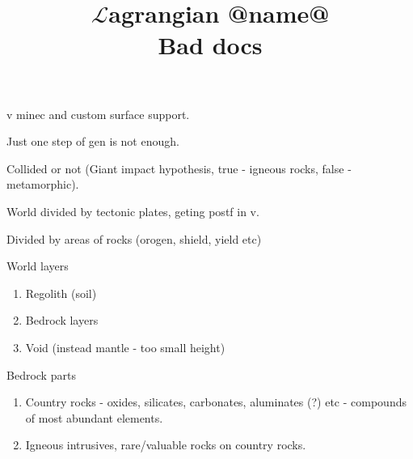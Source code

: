 \documentclass[12pt]{article}
\title{$\mathcal{L}$agrangian @name@ \\ Bad docs}
\begin{document}
    \maketitle

    v minec and custom surface support.

    Just one step of gen is not enough.

    Collided or not (Giant impact hypothesis, true - igneous rocks, false - metamorphic).

    World divided by tectonic plates, geting postf in v.

    Divided by areas of rocks (orogen, shield, yield etc)

    World layers

    \begin{enumerate}
        \item Regolith (soil)
        \item Bedrock layers
        \item Void (instead mantle - too small height)
    \end{enumerate}

    Bedrock parts

    \begin{enumerate}
        \item Country rocks - oxides, silicates, carbonates, aluminates (?) etc - compounds of most abundant elements.
        \item Igneous intrusives, rare/valuable rocks on country rocks.
    \end{enumerate}
\end{document}
